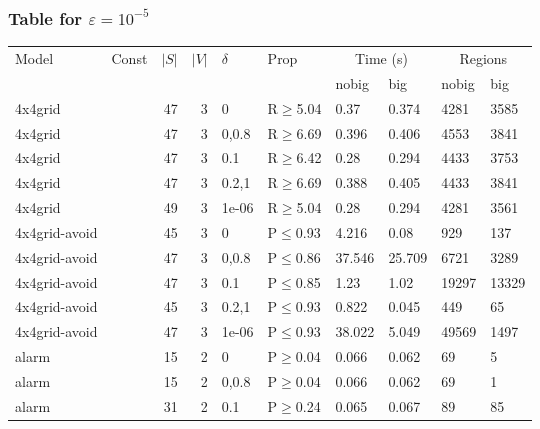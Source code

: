 \subsubsection{Table for \(\varepsilon=10^{-5}\)}
\begin{longtable}{llrrllllll}

        \toprule
        Model & Const & $|S|$ & $|V|$ & $\delta$ & Prop & \multicolumn{2}{c}{Time (s)} & \multicolumn{2}{c}{Regions} \\
        \cmidrule(ll){7-8} \cmidrule(ll){9-10}
        & & & & & & nobig & big & nobig & big \\
        \midrule
        
 4x4grid       &          &     	47 &   3 & 0     & R$\geq$5.04  & 0.37     & 0.374    & 4281    & 3585   \\
 4x4grid       &          &     	47 &   3 & 0,0.8 & R$\geq$6.69  & 0.396    & 0.406    & 4553    & 3841   \\
 4x4grid       &          &     	47 &   3 & 0.1   & R$\geq$6.42  & 0.28     & 0.294    & 4433    & 3753   \\
 4x4grid       &          &     	47 &   3 & 0.2,1 & R$\geq$6.69  & 0.388    & 0.405    & 4433    & 3841   \\
 4x4grid       &          &     	49 &   3 & 1e-06 & R$\geq$5.04  & 0.28     & 0.294    & 4281    & 3561   \\
 4x4grid-avoid &          &     	45 &   3 & 0     & P$\leq$0.93  & 4.216    & 0.08     & 929     & 137    \\
 4x4grid-avoid &          &     	47 &   3 & 0,0.8 & P$\leq$0.86  & 37.546   & 25.709   & 6721    & 3289   \\
 4x4grid-avoid &          &     	47 &   3 & 0.1   & P$\leq$0.85  & 1.23     & 1.02     & 19297   & 13329  \\
 4x4grid-avoid &          &     	45 &   3 & 0.2,1 & P$\leq$0.93  & 0.822    & 0.045    & 449     & 65     \\
 4x4grid-avoid &          &     	47 &   3 & 1e-06 & P$\leq$0.93  & 38.022   & 5.049    & 49569   & 1497   \\
 alarm         &          &     	15 &   2 & 0     & P$\geq$0.04  & 0.066    & 0.062    & 69      & 5      \\
 alarm         &          &     	15 &   2 & 0,0.8 & P$\geq$0.04  & 0.066    & 0.062    & 69      & 1      \\
 alarm         &          &     	31 &   2 & 0.1   & P$\geq$0.24  & 0.065    & 0.067    & 89      & 85     \\

\end{longtable}
